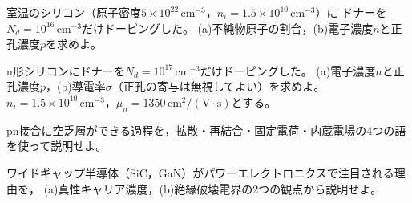 \begin{章末問題}
\item \label{ex2.1}
室温のシリコン（原子密度$5\times10^{22}\,\mathrm{cm^{-3}}$，$n_i = 1.5\times10^{10}\,\mathrm{cm^{-3}}$）に
ドナーを$N_d = 10^{16}\,\mathrm{cm^{-3}}$だけドーピングした。
(a)不純物原子の割合，(b)電子濃度$n$と正孔濃度$p$を求めよ。

\item \label{ex2.2}
n形シリコンにドナーを$N_d = 10^{17}\,\mathrm{cm^{-3}}$だけドーピングした。
(a)電子濃度$n$と正孔濃度$p$，(b)導電率$\sigma$（正孔の寄与は無視してよい）を求めよ。
$n_i = 1.5\times10^{10}\,\mathrm{cm^{-3}}$，$\mu_n = 1350\,\mathrm{cm^2/(V\cdot s)}$とする。

\item \label{ex2.3}
pn接合に空乏層ができる過程を，拡散・再結合・固定電荷・内蔵電場の4つの語を使って説明せよ。

\item \label{ex2.4}
ワイドギャップ半導体（SiC，GaN）がパワーエレクトロニクスで注目される理由を，
(a)真性キャリア濃度，(b)絶縁破壊電界の2つの観点から説明せよ。
\end{章末問題}
